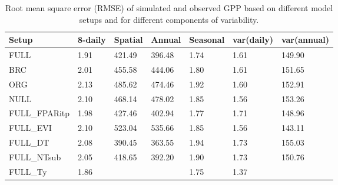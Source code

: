 \documentclass{myreport}
\begin{document}


\begin{table}
\centering
\begin{tabular}{lllllll}
  \toprule
  Setup & 8-daily & Spatial & Annual & Seasonal & var(daily) & var(annual) \\ 
  \midrule
  FULL & 1.91 & 421.49 & 396.48 & 1.74 & 1.61 & 149.90 \\ 
  BRC & 2.01 & 455.58 & 444.06 & 1.80 & 1.61 & 151.65 \\ 
  ORG & 2.13 & 485.62 & 474.46 & 1.92 & 1.60 & 152.91 \\ 
  NULL & 2.10 & 468.14 & 478.02 & 1.85 & 1.56 & 153.26 \\ 
  \midrule
  FULL\_FPARitp & 1.98 & 427.46 & 402.94 & 1.77 & 1.71 & 148.96 \\ 
  FULL\_EVI & 2.10 & 523.04 & 535.66 & 1.85 & 1.56 & 143.11 \\ 
  \midrule
  FULL\_DT & 2.08 & 390.45 & 363.55 & 1.94 & 1.73 & 155.03 \\ 
  FULL\_NTsub & 2.05 & 418.65 & 392.20 & 1.90 & 1.73 & 150.76 \\ 
  FULL\_Ty & 1.86 &  &  & 1.75 & 1.37 & \\ 
  \bottomrule
  \end{tabular}
\caption{Root mean square error (RMSE) of simulated and observed GPP based on different model setups and for different components of variability.} 
\label{tab:rmse}
\end{table}
\end{document}

